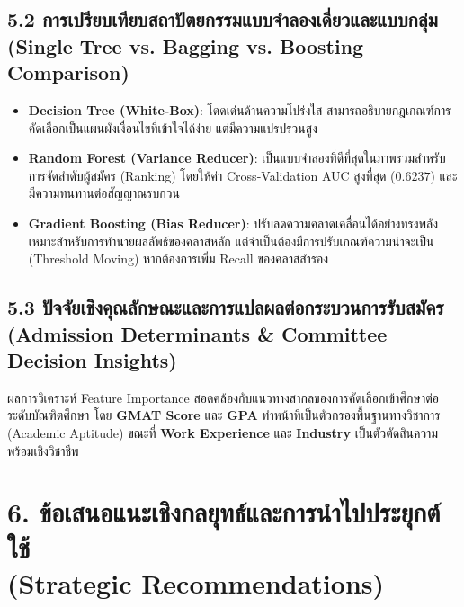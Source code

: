 \documentclass[12pt,a4paper]{article}
\begin{document}
\subsection*{5.2 การเปรียบเทียบสถาปัตยกรรมแบบจำลองเดี่ยวและแบบกลุ่ม\\ \normalsize(Single Tree vs. Bagging vs. Boosting Comparison)}
\begin{itemize}[leftmargin=18pt, itemsep=2pt]
    \item \textbf{Decision Tree (White-Box)}: โดดเด่นด้านความโปร่งใส สามารถอธิบายกฎเกณฑ์การคัดเลือกเป็นแผนผังเงื่อนไขที่เข้าใจได้ง่าย แต่มีความแปรปรวนสูง
    \item \textbf{Random Forest (Variance Reducer)}: เป็นแบบจำลองที่ดีที่สุดในภาพรวมสำหรับการจัดลำดับผู้สมัคร (Ranking) โดยให้ค่า Cross-Validation AUC สูงที่สุด ($0.6237$) และมีความทนทานต่อสัญญาณรบกวน
    \item \textbf{Gradient Boosting (Bias Reducer)}: ปรับลดความคลาดเคลื่อนได้อย่างทรงพลัง เหมาะสำหรับการทำนายผลลัพธ์ของคลาสหลัก แต่จำเป็นต้องมีการปรับเกณฑ์ความน่าจะเป็น (Threshold Moving) หากต้องการเพิ่ม Recall ของคลาสสำรอง
\end{itemize}

\subsection*{5.3 ปัจจัยเชิงคุณลักษณะและการแปลผลต่อกระบวนการรับสมัคร\\ \normalsize(Admission Determinants \& Committee Decision Insights)}
ผลการวิเคราะห์ Feature Importance สอดคล้องกับแนวทางสากลของการคัดเลือกเข้าศึกษาต่อระดับบัณฑิตศึกษา โดย \textbf{GMAT Score} และ \textbf{GPA} ทำหน้าที่เป็นตัวกรองพื้นฐานทางวิชาการ (Academic Aptitude) ขณะที่ \textbf{Work Experience} และ \textbf{Industry} เป็นตัวตัดสินความพร้อมเชิงวิชาชีพ

\section*{6. ข้อเสนอแนะเชิงกลยุทธ์และการนำไปประยุกต์ใช้\\ \large(Strategic Recommendations)}
\end{document}
